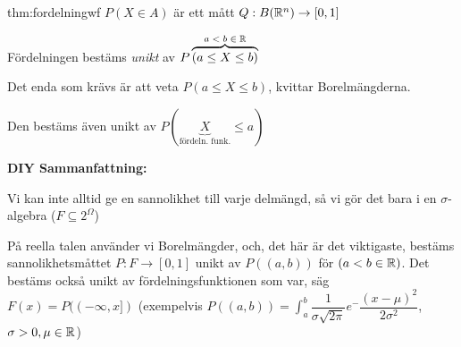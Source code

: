 \par\bigskip
\begin{theo}[Fördelning]{thm:fordelningwf}
  $P(X\in A)$ är ett mått $Q:B(\mathbb{R}^n)\to[0,1]$
  \par\bigskip
  \noindent Fördelningen bestäms \textit{unikt} av $P\overbrace{(a\leq X\leq b)}^{\text{$a<b\in\mathbb{R}$}}$
  \par\bigskip
  \noindent Det enda som krävs är att veta $P(a\leq X\leq b)$, kvittar Borelmängderna.\par
  \noindent Den bestäms även unikt av $P(\underbrace{X}_{\text{fördeln. funk.}}\leq a)$
\end{theo}
\newpage
\noindent\textbf{DIY Sammanfattning:}\par
\noindent Vi kan inte alltid ge en sannolikhet till varje delmängd, så vi gör det bara i en $\sigma$-algebra ($F\subseteq2^\Omega$)\par
\noindent På reella talen använder vi Borelmängder, och, det här är det viktigaste, bestäms sannolikhetsmåttet $P:F\to[0,1]$ unikt av $P((a,b))$ för $(a<b\in\mathbb{R})$. Det bestäms också unikt av fördelningsfunktionen som var, säg $F(x) = P((-\infty,x])$ (exempelvis $P((a,b)) = \int_{a}^{b}\dfrac{1}{\sigma\sqrt{2\pi}}e^-{\dfrac{(x-\mu)^2}{2\sigma^2}}$, $\sigma>0, \mu\in\mathbb{R}$)
